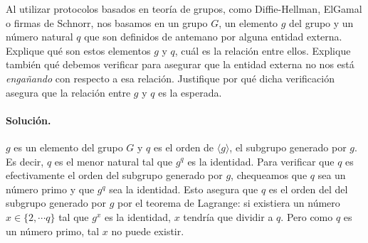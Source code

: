 Al utilizar protocolos basados en teoría de grupos, como Diffie-Hellman, ElGamal o firmas de Schnorr, nos basamos en un grupo $G$, un elemento $g$ del grupo y un número natural $q$ que son definidos de antemano por alguna entidad externa. Explique qué son estos elementos $g$ y $q$, cuál es la relación entre ellos. Explique también qué debemos verificar para asegurar que la entidad externa no nos está \emph{engañando} con respecto a esa relación. Justifique por qué dicha verificación asegura que la relación entre $g$ y $q$ es la esperada.

\paragraph{Solución.} $g$ es un elemento del grupo $G$ y $q$ es el orden de $\langle g\rangle$, el subgrupo generado por $g$. Es decir, $q$ es el menor natural tal que $g^q$ es la identidad. Para verificar que $q$ es efectivamente el orden del subgrupo generado por $g$, chequeamos que $q$ sea un número primo y que $g^q$ sea la identidad. Esto asegura que $q$ es el orden del del subgrupo generado por $g$ por el teorema de Lagrange: si existiera un número $x\in\{2,\cdots q\}$ tal que $g^x$ es la identidad, $x$ tendría que dividir a $q$. Pero como $q$ es un número primo, tal $x$ no puede existir.
